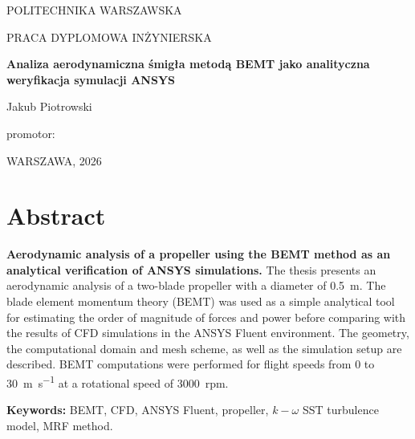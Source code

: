 \documentclass[12pt,a4paper,twoside]{article}
\begin{document}
\begin{titlepage}
	\begin{center}
		{\large POLITECHNIKA WARSZAWSKA\par}
		\vspace{0.8em}
		{\normalsize PRACA DYPLOMOWA INŻYNIERSKA\par}
		\vspace{2em}
		{\large\bfseries Analiza aerodynamiczna śmigła metodą BEMT jako analityczna weryfikacja symulacji ANSYS\par}
		\vspace{3em}
		{\Large Jakub Piotrowski\par}
		\vspace{1em}
		{\normalsize promotor: \underline{\hspace{7cm}}\par}
		\vfill
		{\normalsize WARSZAWA, 2026\par}
	\end{center}
\end{titlepage}

\setcounter{page}{1}
\begin{abstract}
	\begin{spacing}{1.0}
		\textbf{Analiza aerodynamiczna śmigła metodą BEMT jako analityczna weryfikacja symulacji ANSYS.}
		W pracy przedstawiono analizę aerodynamiczną dwułopatowego śmigła o średnicy \SI{0.5}{\meter}. Metoda elementu łopatkowego sprzężona z teorią pędu (BEMT) została zastosowana jako proste, analityczne narzędzie obliczeniowe do oceny rzędu wielkości sił i mocy przed porównaniem z wynikami CFD w środowisku ANSYS Fluent. Opisano geometrię, schemat domeny i siatki oraz konfigurację przygotowanej symulacji. Obliczenia BEMT wykonano dla prędkości lotu od \num{0} do \SI{30}{\meter\per\second} przy prędkości obrotowej \SI{3000}{rpm}.

		\noindent\textbf{Słowa kluczowe:} BEMT, CFD, ANSYS Fluent, śmigło, model turbulencji \(k-\omega\) SST, metoda MRF.
	\end{spacing}
\end{abstract}

\clearpage
\section*{Abstract}
\begin{spacing}{1.0}
	\textbf{Aerodynamic analysis of a propeller using the BEMT method as an analytical verification of ANSYS simulations.}
	The thesis presents an aerodynamic analysis of a two-blade propeller with a diameter of \SI{0.5}{\meter}. The blade element momentum theory (BEMT) was used as a simple analytical tool for estimating the order of magnitude of forces and power before comparing with the results of CFD simulations in the ANSYS Fluent environment. The geometry, the computational domain and mesh scheme, as well as the simulation setup are described. BEMT computations were performed for flight speeds from \num{0} to \SI{30}{\meter\per\second} at a rotational speed of \SI{3000}{rpm}.

	\noindent\textbf{Keywords:} BEMT, CFD, ANSYS Fluent, propeller, \(k-\omega\) SST turbulence model, MRF method.
\end{spacing}
\end{document}

